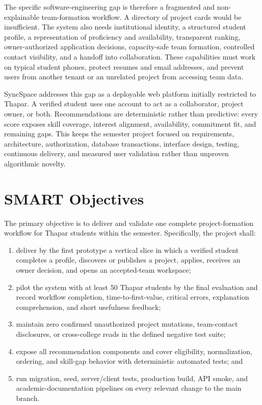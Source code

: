 \documentclass[11pt,a4paper]{article}
\begin{document}
The specific software-engineering gap is therefore a fragmented and non-explainable team-formation workflow. A directory of project cards would be insufficient. The system also needs institutional identity, a structured student profile, a representation of proficiency and availability, transparent ranking, owner-authorized application decisions, capacity-safe team formation, controlled contact visibility, and a handoff into collaboration. These capabilities must work on typical student phones, protect resumes and email addresses, and prevent users from another tenant or an unrelated project from accessing team data.

SyncSpace addresses this gap as a deployable web platform initially restricted to Thapar. A verified student uses one account to act as a collaborator, project owner, or both. Recommendations are deterministic rather than predictive: every score exposes skill coverage, interest alignment, availability, commitment fit, and remaining gaps. This keeps the semester project focused on requirements, architecture, authorization, database transactions, interface design, testing, continuous delivery, and measured user validation rather than unproven algorithmic novelty.

\section{SMART Objectives}

The primary objective is to deliver and validate one complete project-formation workflow for Thapar students within the semester. Specifically, the project shall:

\begin{enumerate}
    \item deliver by the first prototype a vertical slice in which a verified student completes a profile, discovers or publishes a project, applies, receives an owner decision, and opens an accepted-team workspace;
    \item pilot the system with at least 50 Thapar students by the final evaluation and record workflow completion, time-to-first-value, critical errors, explanation comprehension, and short usefulness feedback;
    \item maintain zero confirmed unauthorized project mutations, team-contact disclosures, or cross-college reads in the defined negative test suite;
    \item expose all recommendation components and cover eligibility, normalization, ordering, and skill-gap behavior with deterministic automated tests; and
    \item run migration, seed, server/client tests, production build, API smoke, and academic-documentation pipelines on every relevant change to the main branch.
\end{enumerate}
\end{document}
